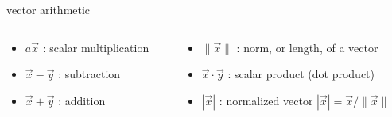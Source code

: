 \begin{frame}[fragile]{vector arithmetic}
\begin{columns}
 \begin{column}{0.5\linewidth}
  \begin{itemize}
   \item $a\vec{x}$ : scalar multiplication
   \item $\vec{x} - \vec{y}$ : subtraction
   \item $\vec{x} + \vec{y}$ : addition

  \end{itemize}
  \end{column}
  \pause

  \begin{column}{0.5\linewidth}
  \begin{itemize}
   \item $\|\vec{x}\|$ : norm, or length, of a vector
   \item $\vec{x} \cdot \vec{y}$ : scalar product (dot product)
   \item $|\vec{x}|$ : normalized vector $|\vec{x}| = \vec{x}/\|\vec{x}\|$
  \end{itemize}
  \end{column}
 \end{columns}

\vspace{40pt}


\end{frame}


